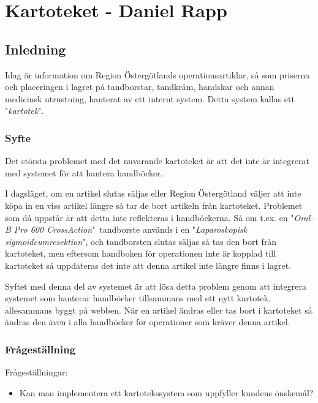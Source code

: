 \section{Kartoteket - Daniel Rapp}
\subsection{Inledning}
Idag är information om Region Östergötlands operationsartiklar, så som priserna och
placeringen i lagret på tandborstar, tandkräm, handskar och annan
medicinsk utrustning, hanterat av ett internt system.
Detta system kallas ett "\textit{kartotek}".


\subsubsection{Syfte}
Det största problemet med det nuvarande kartoteket är
att det inte är integrerat med systemet för att hantera handböcker.

I dagsläget, om en artikel slutas säljas eller Region Östergötland
väljer att inte köpa in en viss artikel längre så tar de bort artikeln
från kartoteket. Problemet som då uppstår är att detta inte reflekteras
i handböckerna. Så om t.ex. en "\textit{Oral-B Pro 600 CrossAction}"\ tandborste används i
en "\textit{Laparoskopisk sigmoideumresektion}", och tandborsten slutas säljas
så tas den bort från kartoteket, men eftersom handboken för operationen inte är
kopplad till kartoteket så uppdateras det inte att denna artikel inte längre finns
i lagret.

Syftet med denna del av systemet är att lösa detta problem genom att
integrera systemet som hanterar handböcker tillsammans med ett nytt kartotek,
allesammans byggt på webben. När en artikel ändras eller tas bort i kartoteket
så ändras den även i alla handböcker för operationer som kräver denna artikel.





\subsubsection{Frågeställning}
Frågeställningar:
\begin{itemize}
  \item Kan man implementera ett kartotekssystem som uppfyller kundens önskemål?
\end{itemize}


